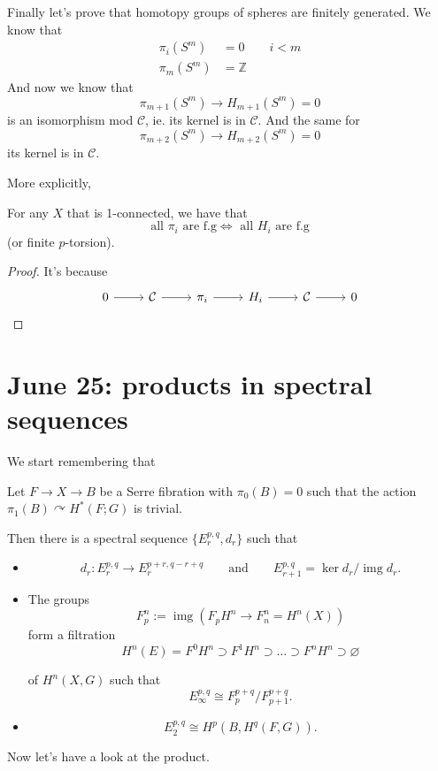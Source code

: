 \documentclass{article}
\newcommand{\Z}{\mathbb{Z}}
\DeclareMathOperator{\img}{img}
\begin{document}
Finally let's prove that homotopy groups of spheres are finitely generated. We know that
\begin{align*}
	\pi_{i}(S^m)&=0\qquad i<m\\ 
	\pi_{m}(S^m)&=\Z
\end{align*}
And now we know that
\[\pi_{m+1}(S^m)\to H_{m+1}(S^m)=0\]
is an isomorphism mod $\mathcal{C}$, ie. its kernel is in $\mathcal{C}$. And the same for
\[\pi_{m+2}(S^m)\to H_{m+2}(S^m)=0\]
its kernel is in $\mathcal{C}$.

More explicitly,

\begin{coro}
	For any $X$ that is 1-connected, we have that
\[\text{all } \pi_{i}\text{ are f.g}\iff\text{ all }H_{i}\text{ are f.g}   \]
(or finite $p$-torsion).
\end{coro}
\begin{proof}
	It's because
 \[\begin{tikzcd}
	0\arrow[r]&\mathcal{C}\arrow[r]&\pi_{i}\arrow[r]&H_{i}\arrow[r]&\mathcal{C}\arrow[r]&0
\end{tikzcd}\]
\end{proof}


\section{June 25: products in spectral sequences}\label{sec:June 25: products in spectral sequence}
We start remembering that
\begin{thm}
	Let $F\to X\to B$ be a Serre fibration with $\pi_0(B)=0$ such that the action $\pi_1(B)\curvearrowright H^*(F;G)$ is trivial.

	Then there is a spectral sequence $\{E_r^{p,q},d_r\}$ such that
\begin{itemize}
	\item \[d_r:E_r^{p,q}\to E_r^{p+r,q-r+q}\qquad\text{and} \qquad  E_{r+1}^{p,q}=\ker d_r/\img d_r.\]
	\item The groups
		\[F_p^n:=\img (F_pH^n\to F^n_n=H^n(X))\]
	form a filtration
	\[H^{n}(E)=F^0H^n\supset F^1H^n\supset \ldots\supset F^nH^n\supset \varnothing \]

	of $H^{n}(X,G)$ such that
	\[E_{\infty}^{p,q}\cong F^{p+q}_p/F^{p+q}_{p+1}.\]
\item \[E^{p,q}_2\cong H^p(B,H^{q}(F,G)).\]
\end{itemize}
\end{thm}

Now let's have a look at the product.
\end{document}
